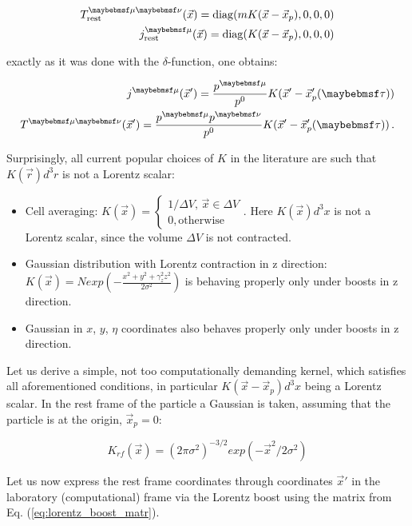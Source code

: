 \begin{align}
  \Tmn_{\mathrm{rest}}(\vec{x}) = \mathrm{diag}(m K(\vec{x} - \vec{x}_p), 0, 0, 0) \\
  \jmu_{\mathrm{rest}}(\vec{x}) = \mathrm{diag}(K(\vec{x} - \vec{x}_p), 0, 0, 0)
\end{align}

exactly as it was done with the $\delta$-function, one obtains:

\begin{align} \label{eq:one_part_tmn}
  \jmu(\vec{x}') = \frac{p^{\mu}}{p^0} K(\vec{x}' - \vec{x}'_p(\tau)) \\
  \Tmn(\vec{x}') = \frac{p^{\mu}p^{\nu}}{p^0} K(\vec{x}' - \vec{x}'_p(\tau)) \,.
\end{align}

Surprisingly, all current popular choices of $K$ in the literature are such that
$K(\vec{r})d^3r$ is not a Lorentz scalar:

\begin{itemize} %
  \item Cell averaging: $K(\vec{x}) = \begin{cases} 1/\Delta V, \, \vec{x} \in \Delta V \\
                                                  0, \text{otherwise} \end{cases}$.
        Here $K(\vec{x})d^3x$ is not a Lorentz scalar,
        since the volume $\Delta V$ is not contracted.
  \item Gaussian distribution with Lorentz contraction in z direction:
        $K(\vec{x}) = N exp\left(-\frac{x^2 + y^2 + \gamma_z^2 z^2}{2 \sigma^2} \right)$
        is behaving properly only under boosts in z direction.
  \item Gaussian in $x$, $y$, $\eta$ coordinates also behaves
        properly only under boosts in z direction.
\end{itemize}

Let us derive a simple, not too computationally demanding kernel, which
satisfies all aforementioned conditions, in particular $K(\vec{x} - \vec{x}_p)d^3x$
being a Lorentz scalar. In the rest frame of the particle a Gaussian is taken, assuming
that the particle is at the origin, $\vec{x}_p = 0$:

\begin{equation}
  K_{rf}(\vec{x}) = (2\pi \sigma^2)^{-3/2} exp(-\vec{x}^2/2\sigma^2)
\end{equation}

Let us now express the rest frame coordinates through coordinates $\vec{x}'$ in the
laboratory (computational) frame via the Lorentz boost using the matrix from
Eq. (\ref{eq:lorentz_boost_matr}).


